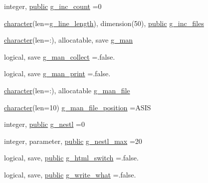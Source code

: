 \begin{DoxyCompactItemize}
\item 
integer, \hyperlink{M__stopwatch_83_8txt_a2f74811300c361e53b430611a7d1769f}{public} \hyperlink{namespacem__fpp_ac4ca8efb06bd0c3da1498d32f0425e3f}{g\+\_\+inc\+\_\+count} =0
\item 
\hyperlink{option__stopwatch_83_8txt_abd4b21fbbd175834027b5224bfe97e66}{character}(len=\hyperlink{namespacem__fpp_ab93f8756cf248cf8db932573009d4664}{g\+\_\+line\+\_\+length}), dimension(50), \hyperlink{M__stopwatch_83_8txt_a2f74811300c361e53b430611a7d1769f}{public} \hyperlink{namespacem__fpp_aaea061b982fcf2f3f3836c5411d931a1}{g\+\_\+inc\+\_\+files}
\item 
\hyperlink{option__stopwatch_83_8txt_abd4b21fbbd175834027b5224bfe97e66}{character}(len=\+:), allocatable, save \hyperlink{namespacem__fpp_a5f6c0f34d4f3cce3be8c2b57f0da6aaa}{g\+\_\+man}
\item 
logical, save \hyperlink{namespacem__fpp_a31995f20860d3826319a0efa28af429e}{g\+\_\+man\+\_\+collect} =.false.
\item 
logical, save \hyperlink{namespacem__fpp_aa87c73c76d03c533762f3c9d807785e7}{g\+\_\+man\+\_\+print} =.false.
\item 
\hyperlink{option__stopwatch_83_8txt_abd4b21fbbd175834027b5224bfe97e66}{character}(len=\+:), allocatable \hyperlink{namespacem__fpp_a398b992e80b784e7cccefd3e87d91761}{g\+\_\+man\+\_\+file}
\item 
\hyperlink{option__stopwatch_83_8txt_abd4b21fbbd175834027b5224bfe97e66}{character}(len=10) \hyperlink{namespacem__fpp_afce7ea0f200a4b77fbfcd9f88fa0bfd0}{g\+\_\+man\+\_\+file\+\_\+position} =\textquotesingle{}A\+S\+IS \textquotesingle{}
\item 
integer, \hyperlink{M__stopwatch_83_8txt_a2f74811300c361e53b430611a7d1769f}{public} \hyperlink{namespacem__fpp_a0278720ea2a632b04d6812ac5b2d443e}{g\+\_\+nestl} =0
\item 
integer, parameter, \hyperlink{M__stopwatch_83_8txt_a2f74811300c361e53b430611a7d1769f}{public} \hyperlink{namespacem__fpp_a8d8e200282a7bfd05dfd73337a7bf4e0}{g\+\_\+nestl\+\_\+max} =20
\item 
logical, save, \hyperlink{M__stopwatch_83_8txt_a2f74811300c361e53b430611a7d1769f}{public} \hyperlink{namespacem__fpp_aa54b63082124b77a4beec31b6e702f7d}{g\+\_\+html\+\_\+switch} =.false.
\item 
logical, save, \hyperlink{M__stopwatch_83_8txt_a2f74811300c361e53b430611a7d1769f}{public} \hyperlink{namespacem__fpp_af335701dbc275345d350373c77b5ddc5}{g\+\_\+write\+\_\+what} =.false.
\item 

\end{DoxyCompactItemize}
